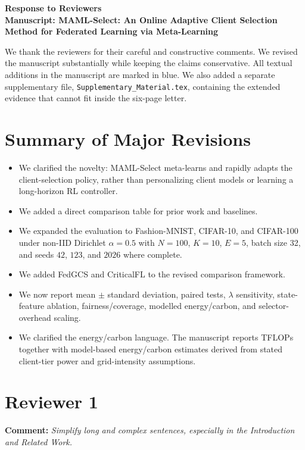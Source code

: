 \documentclass[11pt]{article}
\newcommand{\comment}[1]{\textbf{Comment:} \textit{#1}}
\begin{document}
\begin{center}
    {\Large \textbf{Response to Reviewers}}\\[0.5em]
    \textbf{Manuscript: MAML-Select: An Online Adaptive Client Selection Method for Federated Learning via Meta-Learning}
\end{center}

We thank the reviewers for their careful and constructive comments. We revised the manuscript substantially while keeping the claims conservative. All textual additions in the manuscript are marked in blue. We also added a separate supplementary file, \texttt{Supplementary\_Material.tex}, containing the extended evidence that cannot fit inside the six-page letter.

\section*{Summary of Major Revisions}

\begin{itemize}[leftmargin=*]
    \item We clarified the novelty: MAML-Select meta-learns and rapidly adapts the client-selection policy, rather than personalizing client models or learning a long-horizon RL controller.
    \item We added a direct comparison table for prior work and baselines.
    \item We expanded the evaluation to Fashion-MNIST, CIFAR-10, and CIFAR-100 under non-IID Dirichlet $\alpha=0.5$ with $N=100$, $K=10$, $E=5$, batch size 32, and seeds $42$, $123$, and $2026$ where complete.
    \item We added FedGCS and CriticalFL to the revised comparison framework.
    \item We now report mean $\pm$ standard deviation, paired tests, $\lambda$ sensitivity, state-feature ablation, fairness/coverage, modelled energy/carbon, and selector-overhead scaling.
    \item We clarified the energy/carbon language. The manuscript reports TFLOPs together with model-based energy/carbon estimates derived from stated client-tier power and grid-intensity assumptions.
\end{itemize}

\section*{Reviewer 1}

\comment{Simplify long and complex sentences, especially in the Introduction and Related Work.}
\end{document}
